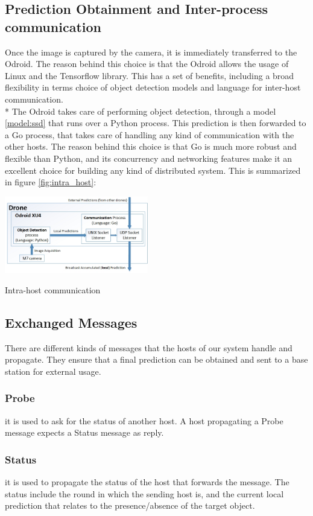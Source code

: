 \documentclass[10pt,conference,compsocconf]{IEEEtran}
\begin{document}
\subsection{Prediction Obtainment and Inter-process communication}Once the image is captured by the camera, it is immediately transferred to the Odroid. The reason behind this choice is that the Odroid allows the usage of Linux and the Tensorflow library. This has a set of benefits, including a broad flexibility in terms choice of object detection models and language for inter-host communication.\\*
The Odroid takes care of performing object detection, through a model \ref{model:ssd} that runs over a Python process. This prediction is then forwarded to a Go process, that takes care of handling any kind of communication with the other hosts. The reason behind this choice is that Go is much more robust and flexible than Python, and its concurrency and networking features make it an excellent choice for building any kind of distributed system. This is summarized in figure \ref{fig:intra_host}:
\begin{center}
	\captionsetup{type=figure}
	\includegraphics[width=0.47\textwidth]{img/protocol_sketch_intra_host.jpg}
	\caption {Intra-host communication}
	\label{fig:intra_host}
\end{center}
\subsection{Exchanged Messages}
There are different kinds of messages that the hosts of our system handle and propagate. They ensure that a final prediction can be obtained and sent to a base station for external usage.
\subsubsection{Probe} it is used to ask for the status of another host. A host propagating a Probe message expects a Status message as reply.
\subsubsection{Status} it is used to propagate the status of the host that forwards the message. The status include the round in which the sending host is, and the current local prediction that relates to the presence/absence of the target object.
\end{document}
